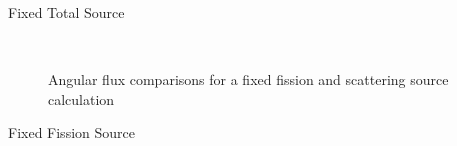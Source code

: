 \begin{frame}[t]{Fixed Total Source}

\begin{figure}[H]
  \centering
  ~
  \caption{Angular flux comparisons for a fixed fission and scattering source calculation}\label{f:1dmoc-fixed-50-angflux}
\end{figure}

\end{frame}


\begin{frame}[t]{Fixed Fission Source}
    
    
    
\end{frame}


